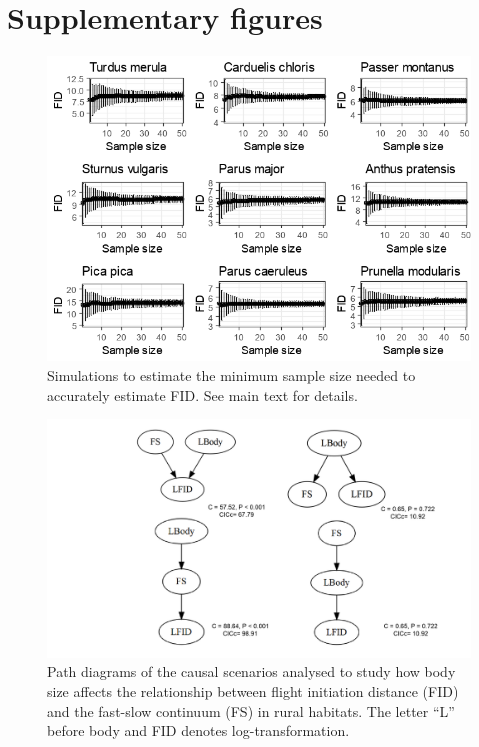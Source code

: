 \section*{Supplementary figures}

\begin{figure}[ht!]
\includegraphics[width=\textwidth]{./Figures/Appendix4_1/Fig_1.png}
\caption[Effects of the sample size on FID estimates]{
Simulations to estimate the minimum sample size needed to accurately estimate
FID. See main text for details.}\label{fig:figApp4.1.1}
\end{figure}


\begin{figure}
\includegraphics[width=\textwidth]{./Figures/Appendix4_1/Fig_2.png}
\caption[Path analysis with body size for rural habitats]{
Path diagrams of the causal scenarios analysed to study how body size affects
the relationship between flight initiation distance (FID) and the fast-slow
continuum (FS) in rural habitats. The letter “L” before body and FID
denotes log-transformation.}\label{fig:figApp4.1.2}
\end{figure}


